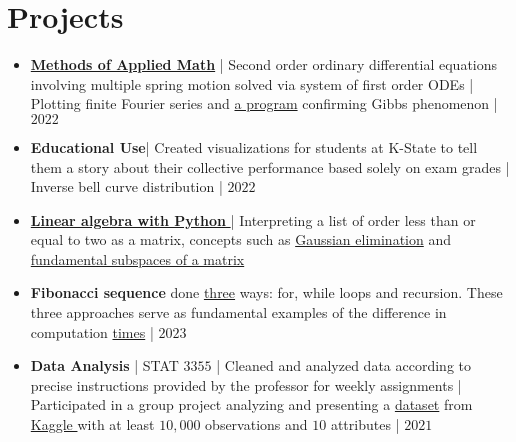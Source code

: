\documentclass{article}
\begin{document}
\section{Projects}
\begin{itemize}
    \item \href{https://github.com/lukebr100/MethodsofAppliedMath/tree/main}{\textbf{Methods of Applied Math}}  | Second order ordinary differential equations involving multiple spring motion solved via system of first order ODEs | Plotting finite Fourier series and \href{https://github.com/lukebr100/MethodsofAppliedMath/blob/main/GibbsExploration.m}{a program} confirming Gibbs phenomenon | $2022$
       
    \item \textbf{Educational Use}| Created visualizations for students at K-State to tell them a story about their collective performance based solely on exam grades | Inverse bell curve distribution  | $2022$
        

     \item \href{https://github.com/lukebr100/Linear-Algebra-}{\textbf{Linear algebra with Python} } | Interpreting a list of order less than or equal to two as a matrix, concepts such as \href{https://github.com/lukebr100/Linear-Algebra-/blob/main/gaussian_elim.py}{Gaussian elimination} and \href{https://github.com/lukebr100/Linear-Algebra-/blob/main/rank_pivots_fund_sub-sapces.py}{fundamental subspaces of a matrix}
     
     
    \item \textbf{Fibonacci sequence} done 
    \href{https://github.com/lukebr100/Fibonacci-a-few-ways/blob/Fibanocci/methods.py}{three} ways: 
    for, while loops and recursion.
    These three approaches serve as fundamental examples of the 
    difference %
    in computation 
    \href{https://github.com/lukebr100/Fibonacci-a-few-ways/blob/Fibanocci/times.py}{times} | $2023$

    \item \textbf{Data Analysis} | STAT $3355$ | Cleaned and analyzed data according to precise instructions provided by the professor for weekly assignments | Participated in a group project analyzing and presenting a \href{https://www.kaggle.com/datasets/stefanoleone992/fifa-20-complete-player-dataset}{dataset} from \href{https://www.kaggle.com/datasets}{Kaggle } with at least $10,000$ observations and $10$ attributes | $2021$
    

\end{itemize}
\end{document}
